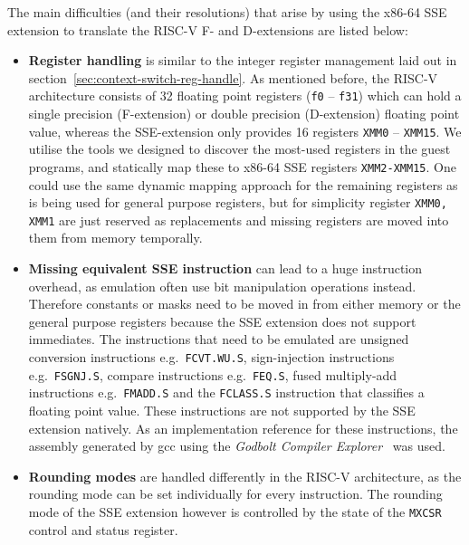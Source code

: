 The main difficulties (and their resolutions) that arise by using the x86-64 SSE extension to translate the RISC-V F- and D-extensions are listed below:
\begin{itemize}
    \item \textbf{Register handling} is similar to the integer register management laid out in section~\ref{sec:context-switch-reg-handle}.
            As mentioned before, the RISC-V architecture consists of 32 floating point registers (\texttt{f0} -- \texttt{f31}) which can hold a single precision (F-extension) or double precision (D-extension) floating point value, whereas the SSE-extension only provides 16 registers \texttt{XMM0} -- \texttt{XMM15}.
            We utilise the tools we designed to discover the most-used registers in the guest programs, and statically map these to x86-64 SSE registers \texttt{XMM2-XMM15}.
            One could use the same dynamic mapping approach for the remaining registers as is being used for general purpose registers, but for simplicity register \texttt{XMM0, XMM1} are just reserved as replacements and missing registers are moved into them from memory temporally.
    \item \textbf{Missing equivalent SSE instruction} can lead to a huge instruction overhead, as emulation often use bit manipulation operations instead.
            Therefore constants or masks need to be moved in from either memory or the general purpose registers because the SSE extension does not support immediates.
            The instructions that need to be emulated are unsigned conversion instructions e.g.~\texttt{FCVT.WU.S}, sign-injection instructions e.g.~\texttt{FSGNJ.S}, compare instructions e.g.~\texttt{FEQ.S}, fused multiply-add instructions e.g.~\texttt{FMADD.S} and the \texttt{FCLASS.S} instruction that classifies a floating point value.
            These instructions are not supported by the SSE extension natively.
            As an implementation reference for these instructions, the assembly generated by gcc using the \textit{Godbolt Compiler Explorer}~\cite{godbolt} was used.
    \item \textbf{Rounding modes} are handled differently in the RISC-V architecture, as the rounding mode can be set individually for every instruction.
            The rounding mode of the SSE extension however is controlled by the state of the \texttt{MXCSR} control and status register.

\end{itemize}
